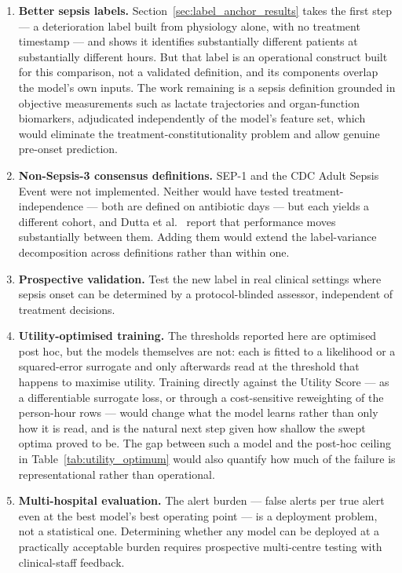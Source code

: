\begin{enumerate}
    \item \textbf{Better sepsis labels.} Section~\ref{sec:label_anchor_results}
    takes the first step --- a deterioration label built from physiology alone,
    with no treatment timestamp --- and shows it identifies substantially
    different patients at substantially different hours. But that label is an
    operational construct built for this comparison, not a validated definition,
    and its components overlap the model's own inputs. The work remaining is a
    sepsis definition grounded in objective measurements such as lactate
    trajectories and organ-function biomarkers, adjudicated independently of the
    model's feature set, which would eliminate the treatment-constitutionality
    problem and allow genuine pre-onset prediction.

    \item \textbf{Non-Sepsis-3 consensus definitions.} SEP-1 and the CDC Adult
    Sepsis Event were not implemented. Neither would have tested
    treatment-independence --- both are defined on antibiotic days --- but each
    yields a different cohort, and Dutta et al.\ \cite{dutta2026performance}
    report that performance moves substantially between them. Adding them would
    extend the label-variance decomposition across definitions rather than
    within one.

    \item \textbf{Prospective validation.} Test the new label in real clinical
    settings where sepsis onset can be determined by a protocol-blinded assessor,
    independent of treatment decisions.

    \item \textbf{Utility-optimised training.} The thresholds reported here are
    optimised post hoc, but the models themselves are not: each is fitted to a
    likelihood or a squared-error surrogate and only afterwards read at the
    threshold that happens to maximise utility. Training directly against the
    Utility Score --- as a differentiable surrogate loss, or through a
    cost-sensitive reweighting of the person-hour rows --- would change what the
    model learns rather than only how it is read, and is the natural next step
    given how shallow the swept optima proved to be. The gap between such a
    model and the post-hoc ceiling in Table~\ref{tab:utility_optimum} would also
    quantify how much of the failure is representational rather than
    operational.

    \item \textbf{Multi-hospital evaluation.} The alert burden ---
    \pcUtilityOptBurdenGbtB{} false alerts per true alert even at the best
    model's best operating point --- is a deployment problem, not a statistical
    one. Determining whether any model can be deployed at a practically
    acceptable burden requires prospective multi-centre testing with
    clinical-staff feedback.
\end{enumerate}


